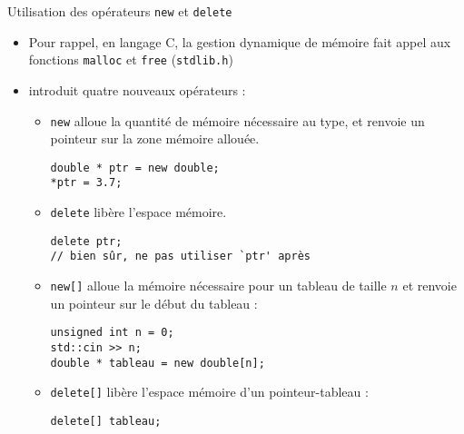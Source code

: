 \documentclass[c]{beamer}
\newcommand{\inline}[1]{\texttt{#1}}
\begin{document}
\begin{frame}[fragile]{Utilisation des opérateurs \texttt{new} et \texttt{delete}}
\begin{itemize}
\item Pour rappel, en langage C, la gestion dynamique de mémoire fait appel aux
fonctions \texttt{malloc} et \texttt{free} (\texttt{stdlib.h})

\item \Cpp introduit quatre nouveaux opérateurs :

\begin{itemize}
\item \inline{new} alloue la quantité de mémoire nécessaire au type, et renvoie un pointeur sur la zone mémoire allouée.
\begin{verbatim}
double * ptr = new double;
*ptr = 3.7;
\end{verbatim}

\item \inline{delete} libère l'espace mémoire.
\begin{verbatim}
delete ptr;
// bien sûr, ne pas utiliser `ptr' après
\end{verbatim}

\pause

\item \inline{new[]} alloue la mémoire nécessaire pour un tableau de taille $n$ et renvoie un pointeur sur le début du tableau :
\begin{verbatim}
unsigned int n = 0;
std::cin >> n;
double * tableau = new double[n];
\end{verbatim}

\item \inline{delete[]} libère l'espace mémoire d'un pointeur-tableau :
\begin{verbatim}
delete[] tableau;
\end{verbatim}
\end{itemize}
\end{itemize}
\end{frame}

\end{document}
